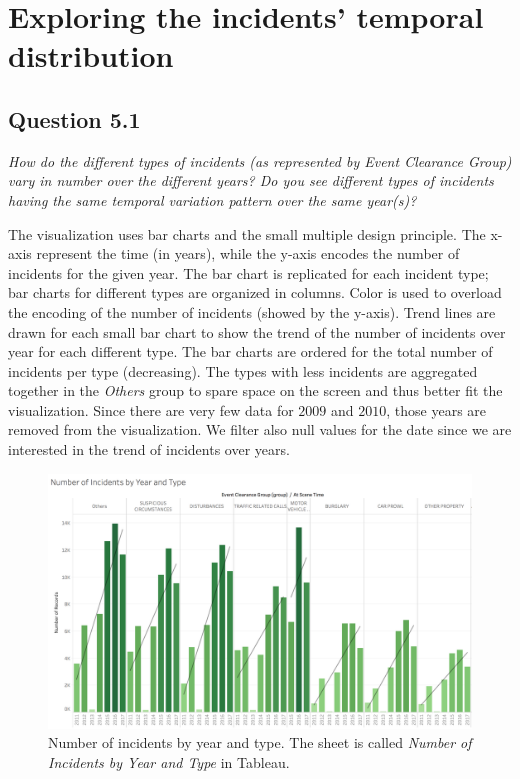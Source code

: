 \section{Exploring the incidents' temporal distribution}

\subsection*{Question 5.1}
\textit{How do the different types of incidents (as represented by Event Clearance Group) vary in number over the different years? Do you see different types of incidents having the same temporal variation pattern over the same year(s)?}

The visualization uses bar charts and the small multiple design principle.
The x-axis represent the time (in years), while the y-axis encodes the number of incidents for the given year.
The bar chart is replicated for each incident type; bar charts for different types are organized in columns.
Color is used to overload the encoding of the number of incidents (showed by the y-axis).
Trend lines are drawn for each small bar chart to show the trend of the number of incidents over year for each different type.
The bar charts are ordered for the total number of incidents per type (decreasing).
The types with less incidents are aggregated together in the \textit{Others} group to spare space on the screen and thus better fit the visualization.
Since there are very few data for $2009$ and $2010$, those years are removed from the visualization.
We filter also null values for the date since we are interested in the trend of incidents over years.

\begin{figure}[h]
	\centering
	\includegraphics[width=0.9\columnwidth]{figures/5_1_incidents_by_type_and_year}
	\caption{Number of incidents by year and type. The sheet is called \textit{Number of Incidents by Year and Type} in Tableau.}
	\label{fig:5_1_incidents_by_type_and_year}
\end{figure}

